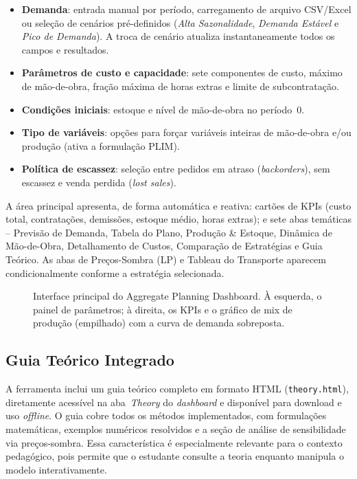 \documentclass[a4paper,11pt]{article}
\begin{document}
\begin{itemize}
  \item \textbf{Demanda}: entrada manual por período, carregamento de arquivo CSV/Excel
    ou seleção de cenários pré-definidos (\textit{Alta Sazonalidade},
    \textit{Demanda Estável} e \textit{Pico de Demanda}). A troca de cenário atualiza
    instantaneamente todos os campos e resultados.
  \item \textbf{Parâmetros de custo e capacidade}: sete componentes de custo,
    máximo de mão-de-obra, fração máxima de horas extras e limite de subcontratação.
  \item \textbf{Condições iniciais}: estoque e nível de mão-de-obra no período~0.
  \item \textbf{Tipo de variáveis}: opções para forçar variáveis inteiras de mão-de-obra
    e/ou produção (ativa a formulação PLIM).
  \item \textbf{Política de escassez}: seleção entre pedidos em atraso
    (\textit{backorders}), sem escassez e venda perdida (\textit{lost sales}).
\end{itemize}

A área principal apresenta, de forma automática e reativa: cartões de KPIs (custo total,
contratações, demissões, estoque médio, horas extras); e sete abas temáticas -- Previsão
de Demanda, Tabela do Plano, Produção \& Estoque, Dinâmica de Mão-de-Obra, Detalhamento
de Custos, Comparação de Estratégias e Guia Teórico. As abas de Preços-Sombra (LP)
e Tableau do Transporte aparecem condicionalmente conforme a estratégia selecionada.

\begin{figure}[htbp]
  \centering
  \caption{Interface principal do Aggregate Planning Dashboard. À esquerda, o painel de
  parâmetros; à direita, os KPIs e o gráfico de mix de produção (empilhado) com a curva
  de demanda sobreposta.}
  \label{fig:dashboard}
\end{figure}

\subsection{Guia Teórico Integrado}

A ferramenta inclui um guia teórico completo em formato HTML (\texttt{theory.html}),
diretamente acessível na aba~\textit{Theory} do \textit{dashboard} e disponível para
download e uso \textit{offline}. O guia cobre todos os métodos implementados, com
formulações matemáticas, exemplos numéricos resolvidos e a seção de análise de
sensibilidade via preços-sombra. Essa característica é especialmente relevante para o
contexto pedagógico, pois permite que o estudante consulte a teoria enquanto manipula o
modelo interativamente.
\end{document}
